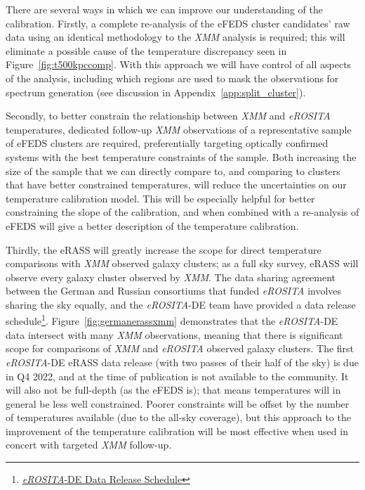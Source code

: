\documentclass[fleqn,usenatbib]{mnras}
\begin{document}
There are several ways in which we can improve our understanding of the calibration. Firstly, a complete re-analysis of the eFEDS cluster candidates' raw data using an identical methodology to the {\em XMM} analysis is required; this will eliminate a possible cause of the temperature discrepancy seen in Figure~\ref{fig:t500kpccomp}. With this approach we will have control of all aspects of the analysis, including which regions are used to mask the observations for spectrum generation (see discussion in Appendix~\ref{app:split_cluster}).

Secondly, to better constrain the relationship between {\em XMM} and {\em eROSITA} temperatures, dedicated follow-up {\em XMM} observations of a representative sample of eFEDS clusters are required, preferentially targeting optically confirmed systems with the best temperature constraints of the sample. Both increasing the size of the sample that we can directly compare to, and comparing to clusters that have better constrained temperatures, will reduce the uncertainties on our temperature calibration model. This will be especially helpful for better constraining the slope of the calibration, and when combined with a re-analysis of eFEDS will give a better description of the temperature calibration.

Thirdly, the eRASS will greatly increase the scope for direct temperature comparisons with {\em XMM} observed galaxy clusters; as a full sky survey, eRASS will observe every galaxy cluster observed by {\em XMM}. The data sharing agreement between the German and Russian consortiums that funded {\em eROSITA} involves sharing the sky equally, and the {\em eROSITA}-DE team have provided a data release schedule\footnote{\href{https://erosita.mpe.mpg.de/erass/}{{\em eROSITA}-DE Data Release Schedule}}. Figure~\ref{fig:germanerassxmm} demonstrates that the {\em eROSITA}-DE data intersect with many {\em XMM} observations, meaning that there is significant scope for comparisons of {\em XMM} and {\em eROSITA} observed galaxy clusters. The first {\em eROSITA}-DE eRASS data release (with two passes of their half of the sky) is due in Q4 2022, and at the time of publication is not available to the community. It will also not be full-depth (as the eFEDS is); that means temperatures will in general be less well constrained. Poorer constraints will be offset by the number of temperatures available (due to the all-sky coverage), but this approach to the improvement of the temperature calibration will be most effective when used in concert with targeted {\em XMM} follow-up.
\end{document}
